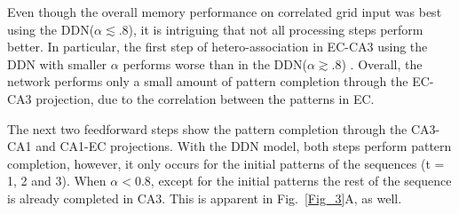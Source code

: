 \documentclass[utf8]{frontiersSCNS} %
\begin{document}

Even though the overall memory performance on correlated grid input was best using the DDN($\alpha \lesssim .8$), it is intriguing that not all processing steps perform better. In particular, the first step of hetero-association in EC-CA3 using the DDN with smaller $\alpha$  performs worse than in the DDN($\alpha \gtrsim .8$) .
%
Overall, the network performs only a small amount of pattern completion through the EC-CA3 projection, due to the correlation between the patterns in EC.

%
The next two feedforward steps show the pattern completion through the CA3-CA1 and CA1-EC projections. With the DDN model, both steps perform pattern completion, however, it only occurs for the initial patterns of the sequences (t = 1, 2 and 3). When $\alpha < 0.8$, except for the initial patterns the rest of the sequence is already completed in CA3. This is apparent in Fig.~\ref{Fig_3}A, as well.
\end{document}
